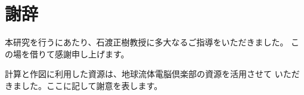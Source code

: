 \documentclass[body]{subfiles}
\begin{document}
\chapter*{謝辞}
本研究を行うにあたり、石渡正樹教授に多大なるご指導をいただきました。
この場を借りて感謝申し上げます。

計算と作図に利用した資源は、地球流体電脳倶楽部の資源を活用させて
いただきました。ここに記して謝意を表します。
\end{document}

